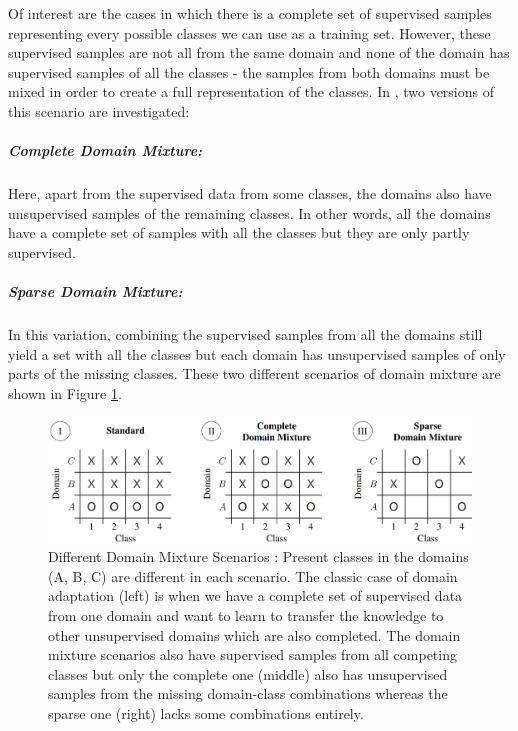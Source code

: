 Of interest are the cases in which there is a complete set of supervised samples representing every possible classes we can use as a training set. However, these supervised samples are not all from the same domain and none of the domain has supervised samples of all the classes - the samples from both domains must be mixed in order to create a full representation of the classes. In \cite{domainMixture}, two versions of this scenario are investigated:  
\subparagraph*{Complete Domain Mixture: } Here, apart from the supervised data from some classes, the domains also have unsupervised samples of the remaining classes. In other words, all the domains have a complete set of samples with all the classes but they are only partly supervised.      
\subparagraph*{Sparse Domain Mixture: } In this variation, combining the supervised samples from all the domains still yield a set with all the classes but each domain has unsupervised samples of only parts of the missing classes. 
These two different scenarios of domain mixture are shown in Figure \ref{fig:scenarioDA}. 

\begin{figure}[tbh]
  \centering
    \includegraphics[width=\textwidth]{abbildungen/scenarioDA.png}
  \caption{Different Domain Mixture Scenarios \cite{domainMixture}: Present classes in the domains (A, B, C) are different in each scenario. The classic case of domain adaptation (left) is when we have a complete set of supervised data from one domain and want to learn to transfer the knowledge to other unsupervised domains which are also completed. The domain mixture scenarios also have supervised samples from all competing classes but only the complete one (middle) also has unsupervised samples from the missing domain-class combinations whereas the sparse one (right) lacks some combinations entirely.}
  \label{fig:scenarioDA}
\end{figure}

